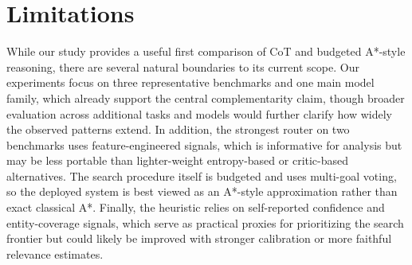 \documentclass[11pt]{article}
\begin{document}


\section*{Limitations}
\label{sec:limitations}
While our study provides a useful first comparison of CoT and budgeted A*-style reasoning, there are several natural boundaries to its current scope. Our experiments focus on three representative benchmarks and one main model family, which already support the central complementarity claim, though broader evaluation across additional tasks and models would further clarify how widely the observed patterns extend. In addition, the strongest router on two benchmarks uses feature-engineered signals, which is informative for analysis but may be less portable than lighter-weight entropy-based or critic-based alternatives. The search procedure itself is budgeted and uses multi-goal voting, so the deployed system is best viewed as an A*-style approximation rather than exact classical A*. Finally, the heuristic relies on self-reported confidence and entity-coverage signals, which serve as practical proxies for prioritizing the search frontier but could likely be improved with stronger calibration or more faithful relevance estimates.




\end{document}
